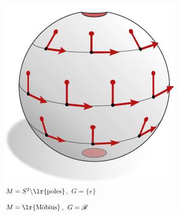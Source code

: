 \hfill
\begin{subfigure}[b]{0.26\textwidth}
	\centering
	\includegraphics[width=.95\textwidth]{figures/G_structure_S2_2.pdf}
	\vspace*{-2ex}
	\captionsetup{format=hang}
	\caption{\small
		\,$M = S^2\backslash\text{\lr{poles}}$,
		\,$G = \{e\}$
	}
	\label{fig:G_structure_intro_k}
\end{subfigure}
\hfill
\begin{subfigure}[b]{0.26\textwidth}
	\centering
	\vspace*{-3.ex}
	\captionsetup{format=hang}
	\caption{\small
		\,$M = \textup{\lr{M\"obius}}$,
		\,$G = \mathscr{R}$
	}
	\label{fig:G_structure_intro_l}
\end{subfigure}